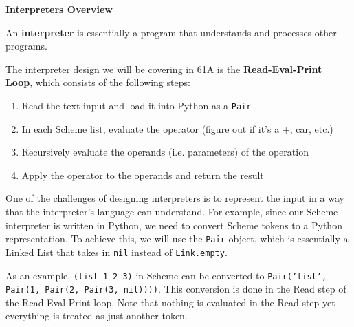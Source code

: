 \textbf{Interpreters Overview} 

An \textbf{interpreter} is essentially a program that understands and processes other programs. 

The interpreter design we will be covering in 61A is the \textbf{Read-Eval-Print Loop}, which consists of the following steps:
\begin{enumerate}
    \item Read the text input and load it into Python as a \texttt{Pair}
    \item In each Scheme list, evaluate the operator (figure out if it's a +, car, etc.)
    \item Recursively evaluate the operands (i.e. parameters) of the operation
    \item Apply the operator to the operands and return the result
\end{enumerate}

One of the challenges of designing interpreters is to represent the input in a way that the interpreter's language can understand.
For example, since our Scheme interpreter is written in Python, we need to convert Scheme tokens to a Python representation.
To achieve this, we will use the \texttt{Pair} object, which is essentially a Linked List that takes in \texttt{nil} instead of \texttt{Link.empty}.

As an example, \texttt{(list 1 2 3)} in Scheme can be converted to \texttt{Pair('list', Pair(1, Pair(2, Pair(3, nil))))}.
This conversion is done in the Read step of the Read-Eval-Print loop. Note that nothing is evaluated in the Read step yet- everything is treated as just another token.
